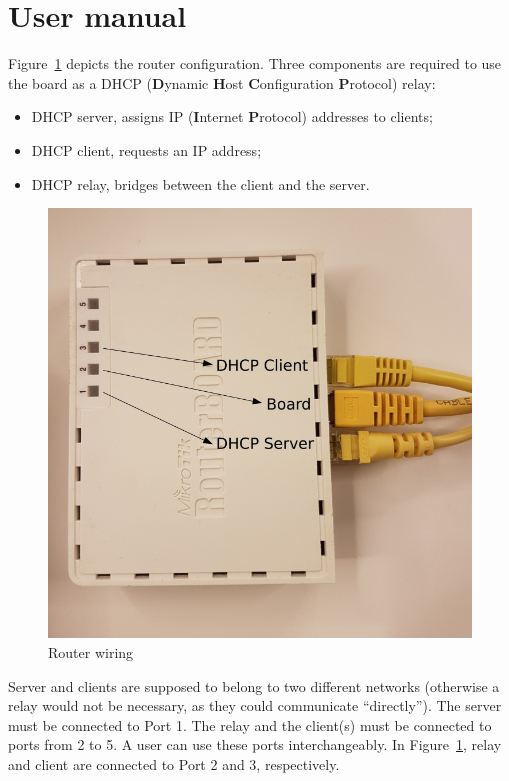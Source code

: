 \section{User manual}
Figure~\ref{fig:router} depicts the router configuration. Three components are required to use the board as a DHCP (\textbf{D}ynamic \textbf{H}ost \textbf{C}onfiguration \textbf{P}rotocol) relay:
\begin{itemize}
	\item DHCP server, assigns IP (\textbf{I}nternet \textbf{P}rotocol) addresses to clients;
	\item DHCP client, requests an IP address;
	\item DHCP relay, bridges between the client and the server.
\end{itemize}

\begin{figure}[h]
	\centering
	\includegraphics[scale=0.7]{images/router}
	\caption{Router wiring}
	\label{fig:router}
\end{figure}

Server and clients are supposed to belong to two different networks (otherwise a relay would not be necessary, as they could communicate ``directly''). The server must be connected to Port 1. The relay and the client(s) must be connected to ports from 2 to 5. A user can use these ports interchangeably. In Figure~\ref{fig:router}, relay and client are connected to Port 2 and 3, respectively. 

